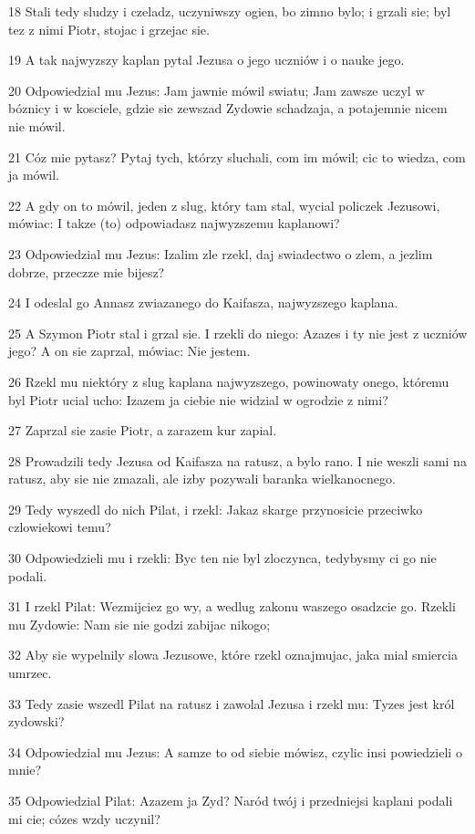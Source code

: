 \par 18 Stali tedy sludzy i czeladz, uczyniwszy ogien, bo zimno bylo; i grzali sie; byl tez z nimi Piotr, stojac i grzejac sie.
\par 19 A tak najwyzszy kaplan pytal Jezusa o jego uczniów i o nauke jego.
\par 20 Odpowiedzial mu Jezus: Jam jawnie mówil swiatu; Jam zawsze uczyl w bóznicy i w kosciele, gdzie sie zewszad Zydowie schadzaja, a potajemnie nicem nie mówil.
\par 21 Cóz mie pytasz? Pytaj tych, którzy sluchali, com im mówil; cic to wiedza, com ja mówil.
\par 22 A gdy on to mówil, jeden z slug, który tam stal, wycial policzek Jezusowi, mówiac: I takze (to) odpowiadasz najwyzszemu kaplanowi?
\par 23 Odpowiedzial mu Jezus: Izalim zle rzekl, daj swiadectwo o zlem, a jezlim dobrze, przeczze mie bijesz?
\par 24 I odeslal go Annasz zwiazanego do Kaifasza, najwyzszego kaplana.
\par 25 A Szymon Piotr stal i grzal sie. I rzekli do niego: Azazes i ty nie jest z uczniów jego? A on sie zaprzal, mówiac: Nie jestem.
\par 26 Rzekl mu niektóry z slug kaplana najwyzszego, powinowaty onego, któremu byl Piotr ucial ucho: Izazem ja ciebie nie widzial w ogrodzie z nimi?
\par 27 Zaprzal sie zasie Piotr, a zarazem kur zapial.
\par 28 Prowadzili tedy Jezusa od Kaifasza na ratusz, a bylo rano. I nie weszli sami na ratusz, aby sie nie zmazali, ale izby pozywali baranka wielkanocnego.
\par 29 Tedy wyszedl do nich Pilat, i rzekl: Jakaz skarge przynosicie przeciwko czlowiekowi temu?
\par 30 Odpowiedzieli mu i rzekli: Byc ten nie byl zloczynca, tedybysmy ci go nie podali.
\par 31 I rzekl Pilat: Wezmijciez go wy, a wedlug zakonu waszego osadzcie go. Rzekli mu Zydowie: Nam sie nie godzi zabijac nikogo;
\par 32 Aby sie wypelnily slowa Jezusowe, które rzekl oznajmujac, jaka mial smiercia umrzec.
\par 33 Tedy zasie wszedl Pilat na ratusz i zawolal Jezusa i rzekl mu: Tyzes jest król zydowski?
\par 34 Odpowiedzial mu Jezus: A samze to od siebie mówisz, czylic insi powiedzieli o mnie?
\par 35 Odpowiedzial Pilat: Azazem ja Zyd? Naród twój i przedniejsi kaplani podali mi cie; cózes wzdy uczynil?
